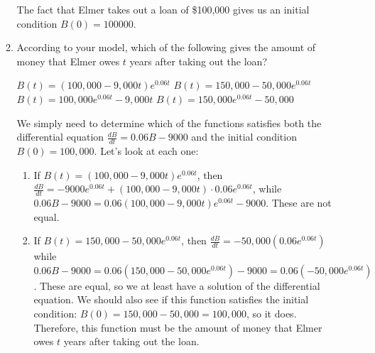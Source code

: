 \documentclass{article}
\begin{document}
\begin{enumerate}
\begin{enumerate}
\begin{solution}
      The fact that Elmer takes out a loan of \$100,000 gives us an
      initial condition $\boxed{B(0) = 100000}$.
    \end{solution}

  \item
    \begin{problem}
      According to your model, which of the following gives the amount of
      money that Elmer owes $t$ years after taking out the loan?
    \end{problem}

    \begin{multicols}{2}
      \begin{enumerate}[label=\protect\maybecircle{\roman*.}]
      \plainitem $B(t) = (100,000 - 9,000 t) e^{0.06 t}$
      \circleitem $B(t) = 150,000 - 50,000 e^{0.06 t}$
      \plainitem $B(t) = 100,000e^{0.06t} - 9,000t$
      \plainitem $B(t) = 150,000 e^{0.06t} - 50,000$
      \end{enumerate}
    \end{multicols}

    \begin{solution}
      We simply need to determine which of the functions satisfies both
      the differential equation $\frac{dB}{dt} = 0.06 B - 9000$ and the
      initial condition $B(0) = 100,000$.  Let's look at each one:
      \begin{enumerate}[label=\roman*.]
      \item If $B(t) = (100,000 - 9,000 t) e^{0.06 t}$, then
        $\frac{dB}{dt} = -9000 e^{0.06 t} + (100,000 - 9,000 t) \cdot 0.06
        e^{0.06 t}$, while $0.06 B - 9000 = 0.06 (100,000 - 9,000 t)
        e^{0.06 t} - 9000$.  These are not equal.
      \item If $B(t) = 150,000 - 50,000 e^{0.06 t}$, then $\frac{dB}{dt} =
        -50,000 (0.06 e^{0.06 t})$ while $0.06 B - 9000 = 0.06 \left(
          150,000 - 50,000 e^{0.06 t} \right) - 9000 = 0.06 \left( -
          50,000 e^{0.06 t} \right)$.  These are equal, so we at least
        have a solution of the differential equation.  We should also see
        if this function satisfies the initial condition: $B(0) = 150,000
        - 50,000 = 100,000$, so it does.  Therefore, this function must be
        the amount of money that Elmer owes $t$ years after taking out the
        loan.  
      \end{enumerate}      
    \end{solution}



\end{enumerate}
\end{enumerate}
\end{document}
